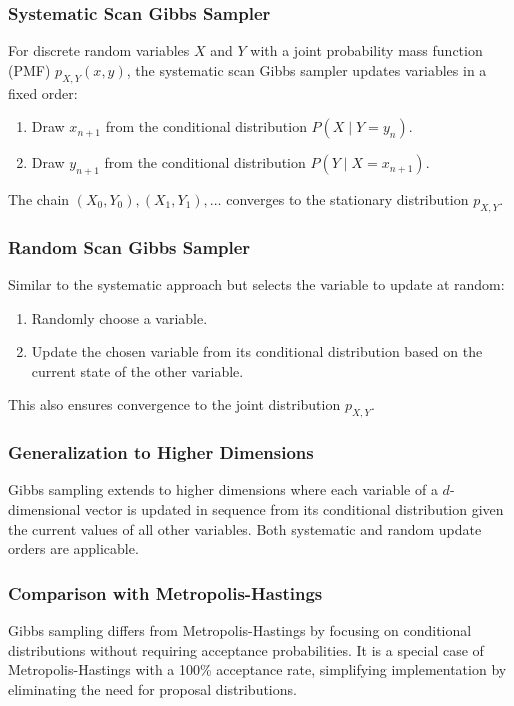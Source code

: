 \documentclass{article}
\begin{document}
\subsubsection{Systematic Scan Gibbs Sampler}
For discrete random variables $X$ and $Y$ with a joint probability mass function (PMF) $p_{X,Y}(x,y)$, the systematic scan Gibbs sampler updates variables in a fixed order:
\begin{enumerate}
    \item Draw $x_{n+1}$ from the conditional distribution $P(X \mid Y = y_n)$.
    \item Draw $y_{n+1}$ from the conditional distribution $P(Y \mid X = x_{n+1})$.
\end{enumerate}
The chain $(X_0, Y_0), (X_1, Y_1), \ldots$ converges to the stationary distribution $p_{X,Y}$.

\subsubsection{Random Scan Gibbs Sampler}
Similar to the systematic approach but selects the variable to update at random:
\begin{enumerate}
    \item Randomly choose a variable.
    \item Update the chosen variable from its conditional distribution based on the current state of the other variable.
\end{enumerate}
This also ensures convergence to the joint distribution $p_{X, Y}$.

\subsubsection{Generalization to Higher Dimensions}
Gibbs sampling extends to higher dimensions where each variable of a $d$-dimensional vector is updated in sequence from its conditional distribution given the current values of all other variables. Both systematic and random update orders are applicable.

\subsubsection{Comparison with Metropolis-Hastings}
Gibbs sampling differs from Metropolis-Hastings by focusing on conditional distributions without requiring acceptance probabilities. It is a special case of Metropolis-Hastings with a 100\% acceptance rate, simplifying implementation by eliminating the need for proposal distributions.
\end{document}
